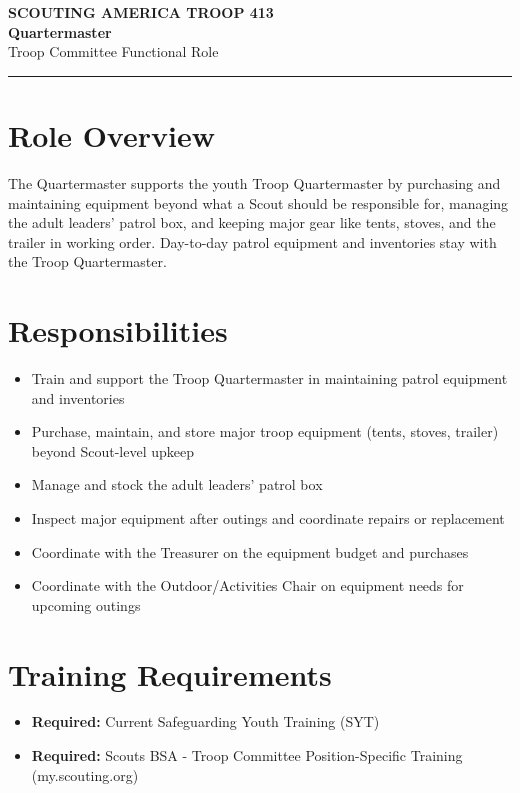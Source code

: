 \documentclass[11pt, letterpaper]{article}
\begin{document}
\begin{center}
  {\small\color{scoutgreen}\textbf{SCOUTING AMERICA \textbullet{} TROOP 413}} \\[4pt]
  {\fontsize{20pt}{24pt}\selectfont\bfseries\color{scoutgreen} Quartermaster} \\[4pt]
  {\large\color{accent} Troop Committee \textbullet{} Functional Role} \\[4pt]
  \textcolor{accent}{\rule{0.6\linewidth}{1pt}}
\end{center}

\vspace{0.3em}

\begin{minipage}[t]{0.48\linewidth}
\raggedright

\section{Role Overview}
The Quartermaster supports the youth Troop Quartermaster by purchasing and maintaining equipment beyond what a Scout should be responsible for, managing the adult leaders' patrol box, and keeping major gear like tents, stoves, and the trailer in working order. Day-to-day patrol equipment and inventories stay with the Troop Quartermaster.

\vspace{0.4em}
\section{Responsibilities}
\begin{itemize}
  \item Train and support the Troop Quartermaster in maintaining patrol equipment and inventories
  \item Purchase, maintain, and store major troop equipment (tents, stoves, trailer) beyond Scout-level upkeep
  \item Manage and stock the adult leaders' patrol box
  \item Inspect major equipment after outings and coordinate repairs or replacement
  \item Coordinate with the Treasurer on the equipment budget and purchases
  \item Coordinate with the Outdoor/Activities Chair on equipment needs for upcoming outings
\end{itemize}

\section{Training Requirements}
\begin{itemize}
  \item \textbf{Required:} Current Safeguarding Youth Training (SYT)
  \item \textbf{Required:} Scouts BSA - Troop Committee Position-Specific Training (my.scouting.org)
\end{itemize}

\end{minipage}
\end{document}
